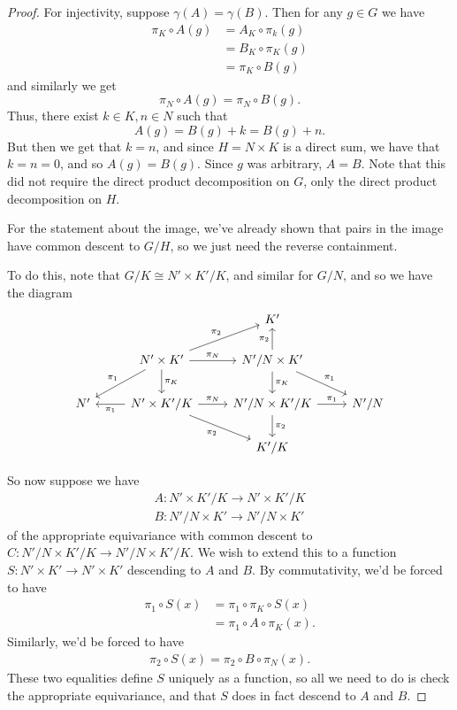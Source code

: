 \documentclass[12nt]{article}
\theoremstyle{plain}
\begin{document}
\begin{proof}
For injectivity, suppose $\gamma(A) = \gamma(B)$. Then for any $g \in G$ we have
\begin{align*}
\pi_K \circ A(g) &= A_K \circ \pi_k(g) \\
	&= B_K \circ \pi_K(g) \\
	&= \pi_K \circ B(g)
\end{align*}
and similarly we get
\[
\pi_N \circ A(g) = \pi_N \circ B(g).
\]
Thus, there exist $k \in K, n \in N$ such that
\[
A(g) = B(g) + k = B(g) + n.
\]
But then we get that $k = n$, and since $H = N \times K$ is a direct sum, we have that $k = n = 0$, and so $A(g) = B(g)$. Since $g$ was arbitrary, $A = B$. Note that this did not require the direct product decomposition on $G$, only the direct product decomposition on $H$.

For the statement about the image, we've already shown that pairs in the image have common descent to $G/H$, so we just need the reverse containment.

To do this, note that $G/K \cong N' \times K'/K$, and similar for $G/N$, and so we have the diagram
\[
\begin{tikzcd}
& & K' \\
& N' \times K' \ar[r, "\pi_N"] \ar[d, "\pi_K"] \ar[ur, "\pi_2"]  \ar[dl, "\pi_1"'] & N'/N \times K' \ar[d, "\pi_K"] \ar[u, "\pi_2"] \ar[dr, "\pi_1"] \\
N' & N' \times K'/K \ar[r, "\pi_N"] \ar[l, "\pi_1"] \ar[dr, "\pi_2"'] & N'/N \times K'/K \ar[r, "\pi_1"] \ar[d, "\pi_2"] & N'/N \\
 & & K'/K
\end{tikzcd}
\]

So now suppose we have 
\begin{align*}
A : N' \times K'/K \to N' \times K'/K \\
B : N'/N \times K' \to N'/N \times K'
\end{align*}
of the appropriate equivariance with common descent to $C : N'/N \times K'/K \to N'/N \times K'/K$. 
We wish to extend this to a function $S : N' \times K' \to N' \times K'$ descending to $A$ and $B$. By commutativity, we'd be forced to have
\begin{align*}
\pi_1 \circ S(x) &= \pi_1 \circ \pi_K \circ S(x) \\
	&= \pi_1 \circ A \circ \pi_K(x).
\end{align*}
Similarly, we'd be forced to have
\begin{align*}
\pi_2 \circ S(x) = \pi_2 \circ B \circ \pi_N(x).
\end{align*}
These two equalities define $S$ uniquely as a function, so all we need to do is check the appropriate equivariance, and that $S$ does in fact descend to $A$ and $B$.


\end{proof}
\end{document}
